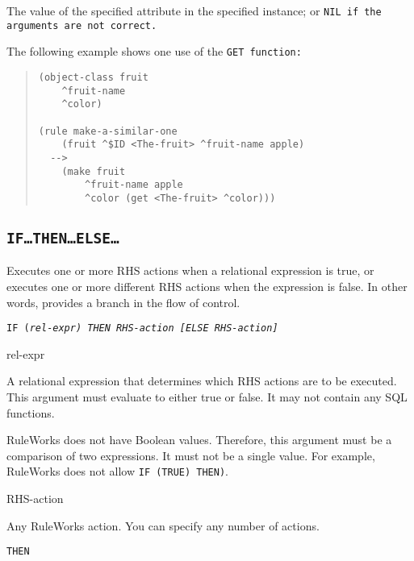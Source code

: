\ReturnValue

The value of the specified attribute in the specified instance; or
\tt{NIL} if the arguments are not correct.

\Example

The following example shows one use of the \tt{GET} function:

\begin{quote}
\begin{verbatim}
(object-class fruit
    ^fruit-name
    ^color)

(rule make-a-similar-one
    (fruit ^$ID <The-fruit> ^fruit-name apple)
  -->
    (make fruit
        ^fruit-name apple 
        ^color (get <The-fruit> ^color)))
\end{verbatim}
\end{quote}

\subsection{\tt{IF}\ldots\tt{THEN}\ldots\tt{ELSE}\ldots}

Executes one or more RHS actions when a relational expression is true,
or executes one or more different RHS actions when the expression is
false. In other words, provides a branch in the flow of control.

\Format

\tt{IF} (\it{rel-expr})
     \tt{THEN} \it{RHS-action}
     [\tt{ELSE} \it{RHS-action}]

\begin{arguments}
\item[rel-expr]

  A relational expression that determines which RHS actions are to be
  executed. This argument must evaluate to either true or false. It
  may not contain any SQL functions.
  \begin{note}
    RuleWorks does not have Boolean values. Therefore, this argument
    must be a comparison of two expressions. It must not be a single
    value. For example, RuleWorks does not allow
    \verb|IF (TRUE) THEN)|.
  \end{note}

\item[RHS-action]

  Any RuleWorks action. You can specify any number of actions.
\end{arguments}

\Clauses

\tt{THEN}


